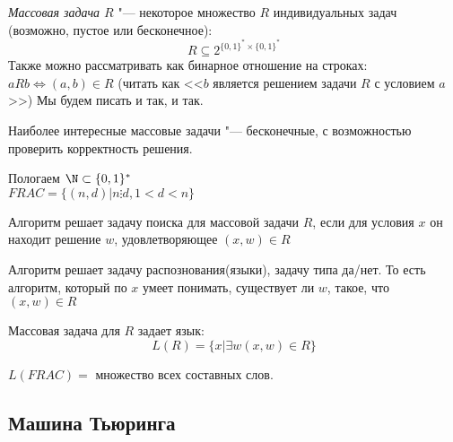 \begin{Def}
	\textit{Массовая задача $R$} "--- некоторое множество $R$ индивидуальных задач (возможно, пустое или бесконечное):
	\[ R \subseteq 2^{\{0,1\}^*\times\{0,1\}^*}\] 
	Также можно рассматривать как бинарное отношение на строках: $aRb \iff (a, b) \in R$
	(читать как <<$b$ является решением задачи $R$ с условием $a$>>)
	Мы будем писать и так, и так.
\end{Def}

\begin{Rem}
	Наиболее интересные массовые задачи "--- бесконечные, с возможностью проверить корректность решения. 
\end{Rem}

\begin{exmp}
	Пологаем $\N \subset \{0, 1\}^*$\\
	$FRAC = \{(n, d) | n \vdots d, 1 < d < n\}$\\
\end{exmp}

\begin{Def}
	Алгоритм решает задачу поиска для массовой задачи $R$, если для условия $x$ он находит решение $w$, удовлетворяющее $(x, w) \in R$
\end{Def}

\begin{Def}
	Алгоритм решает задачу распознования(языки), задачу типа да/нет. 
	То есть алгоритм, который по $x$ умеет понимать, существует ли $w$, такое, что $(x, w) \in R$ 
\end{Def}

\begin{Rem}
	Массовая задача для $R$ задает язык:
	$$L(R) = \{x | \exists w (x, w) \in R\} $$
\end{Rem}

\begin{exmp}
	$L(FRAC) =$ множество всех составных слов. 
\end{exmp}


\subsection{Машина Тьюринга}
